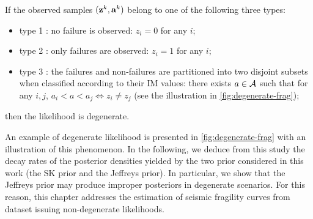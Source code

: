 \begin{defi}\label{def:degeneracy}
    {If the observed samples $(\mathbf{z}^k,\mathbf{a}^k)$ belong to one of the following three types:}
    \begin{itemize}
        \item {type 1 : no failure is observed: $z_i=0$ for any $i$;}
        \item {type 2 : only failures are observed: $z_i=1$ for any $i$;}
        \item {type 3 : the failures and non-failures are partitioned into two disjoint subsets when classified according to their IM values:}
        there exists $a\in\mathcal{A}$ such that for any $i,j$, $a_i<a<a_j\Longleftrightarrow z_i\ne z_j$ (see the illustration in \cref{fig:degenerate-frag});
    \end{itemize}
    then the likelihood is degenerate.
\end{defi}



An example of degenerate likelihood is presented in \cref{fig:degenerate-frag} with an illustration of this phenomenon.
In the following, we deduce from this study the decay rates of the posterior densities 
yielded by the two prior considered in this work (the SK prior and the Jeffreys prior).
In particular, we show that the Jeffreys prior may produce improper posteriors in degenerate scenarios.
For this reason, this chapter addresses the estimation of seismic fragility curves from dataset issuing non-degenerate likelihoods.


